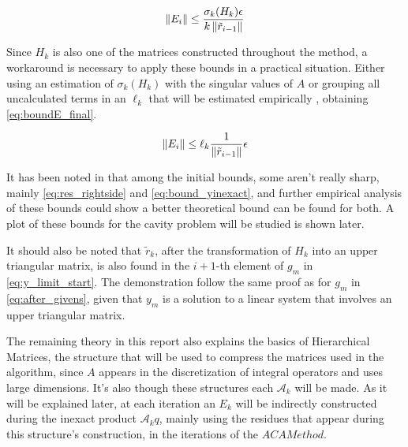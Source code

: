 \begin{equation}\label{eq:bound_E}
    \left\lVert E_{i}\right\rVert \leq \frac{\sigma_{k}(H_{k})\epsilon}{k\left\lVert\tilde{r}_{i-1}\right\rVert}
\end{equation}

Since $H_{k}$ is also one of the matrices constructed throughout the method, a workaround is necessary to apply these bounds in a practical situation. Either using an estimation of $\sigma_{k}(H_{k})$ with the singular values of $A$ or grouping all uncalculated terms in an $\ell_{k}$ that will be estimated empirically \cite{simoncini2003theory}, obtaining \ref{eq:boundE_final}.

\begin{equation}\label{eq:boundE_final}
    \left\lVert E_{i}\right\rVert \leq \ell_{k} \frac{1}{\left\lVert\tilde{r}_{i-1}\right\rVert} \epsilon
\end{equation}

It has been noted in \cite{simoncini2003theory} that among the initial bounds, some aren't really sharp, mainly \ref{eq:res_rightside} and \ref{eq:bound_yinexact}, and further empirical analysis of these bounds could show a better theoretical bound can be found for both. A plot of these bounds for the cavity problem will be studied is shown later.

It should also be noted that $\tilde{r}_{k}$, after the transformation of $H_{k}$ into an upper triangular matrix, is also found in the $i+1$-th element of $g_{m}$ in \ref{eq:y_limit_start}. The demonstration follow the same proof as for $g_{m}$ in \ref{eq:after_givens}, given that $y_{m}$ is a solution to a linear system that involves an upper triangular matrix.

The remaining theory in this report also explains the basics of Hierarchical Matrices, the structure that will be used to compress the matrices used in the algorithm, since $A$ appears in the discretization of integral operators and uses large dimensions.
It's also though these structures each $\mathcal{A}_{k}$ will be made. As it will be explained later, at each iteration an $E_{k}$ will be indirectly constructed during the inexact product $\mathcal{A}_{k}q$, mainly using the residues that appear during this structure's construction, in the iterations of the $ACA Method$.